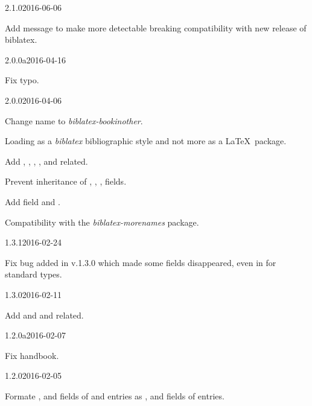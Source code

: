 \documentclass{ltxdockit}[2011/03/25]
\newcommand{\pkg}[1]{\emph{#1}}
\newcommand{\biblatex}{\emph{biblatex}\xspace}
\begin{document}
\begin{changelog}
\begin{release}{2.1.0}{2016-06-06}
  \item Add message to make more detectable breaking compatibility with new release of biblatex.
\end{release}

\begin{release}{2.0.0a}{2016-04-16}
  \item Fix typo.
\end{release}

\begin{release}{2.0.0}{2016-04-06}
\item Change name to \pkg{biblatex-bookinother}.
\item Loading as a \biblatex bibliographic style and not more as a \LaTeX\ package.
\item Add , , , ,  and related.
\item Prevent inheritance of , , ,  fields.
\item Add field  and .
\item Compatibility with the \pkg{biblatex-morenames} package.
\end{release}

\begin{release}{1.3.1}{2016-02-24}
\item Fix bug added in v.1.3.0 which made some fields disappeared, even in for standard types.
\end{release}

\begin{release}{1.3.0}{2016-02-11}
\item Add  and  and related.
\end{release}

\begin{release}{1.2.0a}{2016-02-07}
\item Fix handbook.
\end{release}

\begin{release}{1.2.0}{2016-02-05}
\item Formate   ,  and  fields of   and  entries as ,  and  fields of  entries.
\end{release}


\end{changelog}
\end{document}
